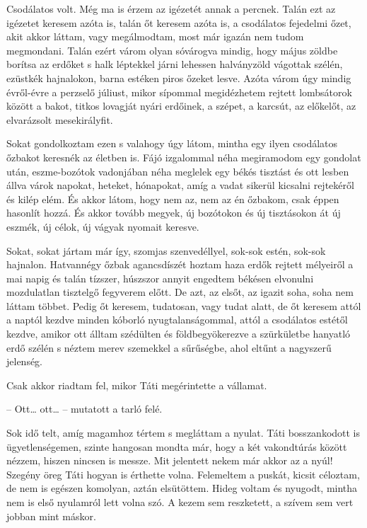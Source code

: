 \documentclass{IEEEtran}
\begin{document}
Csodálatos volt. Még ma is érzem az igézetét annak a percnek. Talán ezt az igézetet keresem azóta is, talán őt keresem azóta is, a csodálatos fejedelmi őzet, akit akkor láttam, vagy megálmodtam, most már igazán nem tudom megmondani. Talán ezért várom olyan sóvárogva mindig, hogy május zöldbe borítsa az erdőket s halk léptekkel járni lehessen halványzöld vágottak szélén, ezüstkék hajnalokon, barna estéken piros őzeket lesve. Azóta várom úgy mindig évről-évre a perzselő júliust, mikor sípommal megidézhetem rejtett lombsátorok között a bakot, titkos lovagját nyári erdőinek, a szépet, a karcsút, az előkelőt, az elvarázsolt mesekirályfit.

Sokat gondolkoztam ezen s valahogy úgy látom, mintha egy ilyen csodálatos őzbakot keresnék az életben is. Fájó izgalommal néha megiramodom egy gondolat után, eszme-bozótok vadonjában néha meglelek egy békés tisztást és ott lesben állva várok napokat, heteket, hónapokat, amíg a vadat sikerül kicsalni rejtekéről és kilép elém. És akkor látom, hogy nem az, nem az én őzbakom, csak éppen hasonlít hozzá. És akkor tovább megyek, új bozótokon és új tisztásokon át új eszmék, új célok, új vágyak nyomait keresve.

Sokat, sokat jártam már így, szomjas szenvedéllyel, sok-sok estén, sok-sok hajnalon. Hatvannégy őzbak agancsdíszét hoztam haza erdők rejtett mélyeiről a mai napig és talán tízszer, húszszor annyit engedtem békésen elvonulni mozdulatlan tisztelgő fegyverem előtt. De azt, az elsőt, az igazit soha, soha nem láttam többet. Pedig őt keresem, tudatosan, vagy tudat alatt, de őt keresem attól a naptól kezdve minden kóborló nyugtalanságommal, attól a csodálatos estétől kezdve, amikor ott álltam szédülten és földbegyökerezve a szürkületbe hanyatló erdő szélén s néztem merev szemekkel a sűrűségbe, ahol eltűnt a nagyszerű jelenség.

Csak akkor riadtam fel, mikor Táti megérintette a vállamat.

– Ott… ott… – mutatott a tarló felé.

Sok idő telt, amíg magamhoz tértem s megláttam a nyulat. Táti bosszankodott is ügyetlenségemen, szinte hangosan mondta már, hogy a két vakondtúrás között nézzem, hiszen nincsen is messze. Mit jelentett nekem már akkor az a nyúl! Szegény öreg Táti hogyan is érthette volna. Felemeltem a puskát, kicsit céloztam, de nem is egészen komolyan, aztán elsütöttem. Hideg voltam és nyugodt, mintha nem is első nyulamról lett volna szó. A kezem sem reszketett, a szívem sem vert jobban mint máskor.
\end{document}

